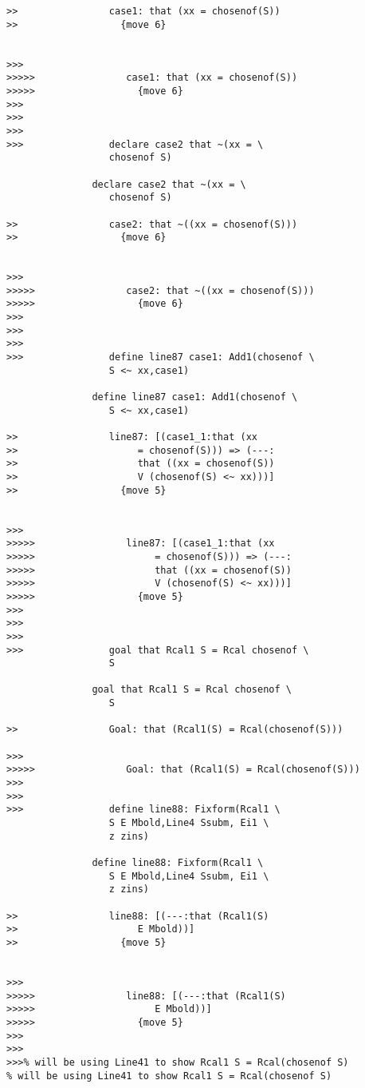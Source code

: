 \documentclass[12pt]{article}
\begin{document}
\begin{verbatim}
>>                case1: that (xx = chosenof(S))
>>                  {move 6}


>>>
>>>>>                case1: that (xx = chosenof(S))
>>>>>                  {move 6}
>>>
>>>
>>>
>>>               declare case2 that ~(xx = \
                  chosenof S)

               declare case2 that ~(xx = \
                  chosenof S)

>>                case2: that ~((xx = chosenof(S)))
>>                  {move 6}


>>>
>>>>>                case2: that ~((xx = chosenof(S)))
>>>>>                  {move 6}
>>>
>>>
>>>
>>>               define line87 case1: Add1(chosenof \
                  S <~ xx,case1)

               define line87 case1: Add1(chosenof \
                  S <~ xx,case1)

>>                line87: [(case1_1:that (xx
>>                     = chosenof(S))) => (---:
>>                     that ((xx = chosenof(S))
>>                     V (chosenof(S) <~ xx)))]
>>                  {move 5}


>>>
>>>>>                line87: [(case1_1:that (xx
>>>>>                     = chosenof(S))) => (---:
>>>>>                     that ((xx = chosenof(S))
>>>>>                     V (chosenof(S) <~ xx)))]
>>>>>                  {move 5}
>>>
>>>
>>>
>>>               goal that Rcal1 S = Rcal chosenof \
                  S

               goal that Rcal1 S = Rcal chosenof \
                  S

>>                Goal: that (Rcal1(S) = Rcal(chosenof(S)))

>>>
>>>>>                Goal: that (Rcal1(S) = Rcal(chosenof(S)))
>>>
>>>
>>>               define line88: Fixform(Rcal1 \
                  S E Mbold,Line4 Ssubm, Ei1 \
                  z zins)

               define line88: Fixform(Rcal1 \
                  S E Mbold,Line4 Ssubm, Ei1 \
                  z zins)

>>                line88: [(---:that (Rcal1(S)
>>                     E Mbold))]
>>                  {move 5}


>>>
>>>>>                line88: [(---:that (Rcal1(S)
>>>>>                     E Mbold))]
>>>>>                  {move 5}
>>>
>>>
>>>% will be using Line41 to show Rcal1 S = Rcal(chosenof S)
% will be using Line41 to show Rcal1 S = Rcal(chosenof S)


\end{verbatim}
\end{document}
